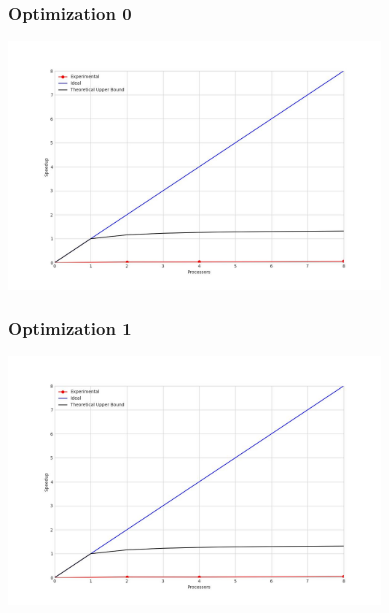 \subsubsection{Optimization 0}
\begin{center}
    \resizebox{0.8\textwidth}{!}{}
    \includegraphics[width=0.74\textwidth]{../img/speedup-graph_type-random-500000-O0}
\end{center}

\subsubsection{Optimization 1}
\begin{center}
    \resizebox{0.8\textwidth}{!}{}
    \includegraphics[width=0.74\textwidth]{../img/speedup-graph_type-random-500000-O1}
\end{center}

\clearpage

